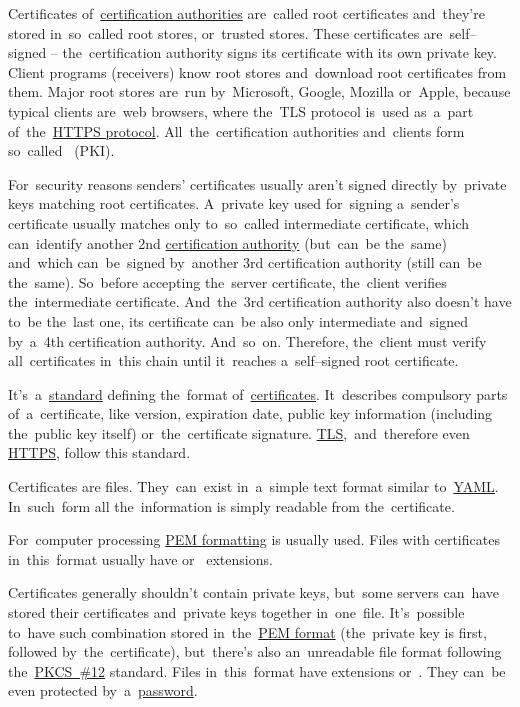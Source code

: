 Certificates of~\hyperref[certificationauthority]{certification authorities} are~called root certificates and~they're stored in~so~called root stores, or~trusted stores.
These certificates are~self--signed -- the~certification authority signs its certificate with its own private key.
Client programs (receivers) know root stores and~download root certificates from them.
Major root stores are~run by~Microsoft, Google, Mozilla or~Apple, because typical clients are~web browsers, where the~TLS protocol is~used as~a~part of~the~\hyperref[https]{HTTPS protocol}.
All~the~certification authorities and~clients form so~called ~(PKI).

For~security reasons senders' certificates usually aren't signed directly by~private keys matching root certificates.
A~private key used for~signing a~sender's certificate usually matches only to~so~called intermediate certificate, which can~identify another 2nd \hyperref[certificationauthority]{certification authority} (but~can~be the~same) and~which can~be~signed by~another 3rd certification authority (still can~be the~same).
So~before accepting the~server certificate, the~client verifies the~intermediate certificate.
And~the~3rd certification authority also doesn't have to~be the~last one, its certificate can~be also only intermediate and~signed by~a~4th certification authority.
And~so~on.
Therefore, the~client must verify all~certificates in~this chain until it~reaches a~self--signed root certificate.

\label{x509}
It's~a~\hyperref[protocolstandard]{standard} defining the~format of~\hyperref[certificate]{certificates}.
It~describes compulsory parts of~a~certificate, like version, expiration date, public key information (including the~public key itself) or~the~certificate signature.
\hyperref[tls]{TLS},~and~therefore even \hyperref[https]{HTTPS}, follow this standard.

Certificates are files.
They~can~exist in~a~simple text format similar to~\hyperref[yaml]{YAML}.
In~such~form all the~information is simply readable from the~certificate.

For~computer processing \hyperref[pem]{PEM formatting} is usually used.
Files with certificates in~this~format usually have  or~ extensions.

Certificates generally shouldn't contain private keys, but~some servers can~have stored their certificates and~private keys together in~one~file.
It's~possible to~have such combination stored in~the~\hyperref[pem]{PEM format} (the~private key is first, followed by~the~certificate), but~there's also an~unreadable file format following the~\hyperref[pkcs]{PKCS~\#12} standard.
Files in~this~format have extensions  or~.
They can~be even protected by~a~\hyperref[keypassword]{password}.
\newpage
